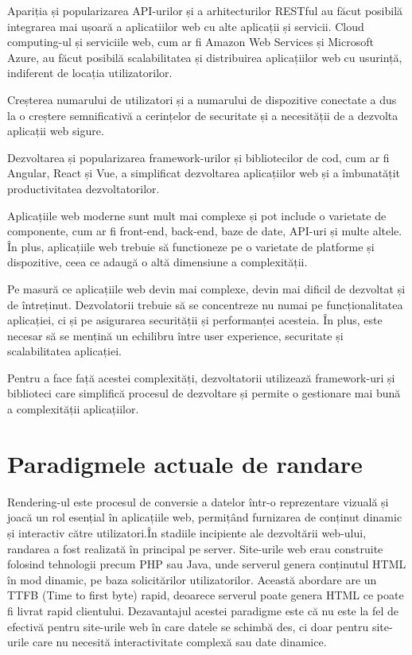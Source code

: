\documentclass[12pt, a4paper]{report}
\begin{document}
Apariția și popularizarea API-urilor și a arhitecturilor RESTful au făcut posibilă integrarea mai ușoară a aplicatiilor web cu alte aplicații și servicii. Cloud computing-ul și serviciile web, cum ar fi Amazon Web Services și Microsoft Azure, au făcut posibilă scalabilitatea și distribuirea aplicațiilor web cu usurință, indiferent de locația utilizatorilor.

Creșterea numarului de utilizatori și a numarului de dispozitive conectate a dus la o creștere semnificativă a cerințelor de securitate și a necesității de a dezvolta aplicații web sigure.

Dezvoltarea și popularizarea framework-urilor și bibliotecilor de cod, cum ar fi Angular, React și Vue, a simplificat dezvoltarea aplicațiilor web și a îmbunatățit productivitatea dezvoltatorilor.

Aplicațiile web moderne sunt mult mai complexe și pot include o varietate de componente, cum ar fi front-end, back-end, baze de date, API-uri și multe altele. În plus, aplicațiile web trebuie să functioneze pe o varietate de platforme și dispozitive, ceea ce adaugă o altă dimensiune a complexității.

Pe masură ce aplicațiile web devin mai complexe, devin mai dificil de dezvoltat și de întreținut. Dezvolatorii trebuie să se concentreze nu numai pe funcționalitatea aplicației, ci și pe asigurarea securității și performanței acesteia. În plus, este necesar să se mențină un echilibru între user experience, securitate și scalabilitatea aplicației.

Pentru a face față acestei complexități, dezvoltatorii utilizează framework-uri și biblioteci care simplifică procesul de dezvoltare și permite o gestionare mai bună a complexității aplicațiilor.


\chapter{Paradigmele actuale de randare}
Rendering-ul este procesul de conversie a datelor într-o reprezentare vizuală și joacă un rol esențial în aplicațiile web, permițând furnizarea de conținut dinamic și interactiv către utilizatori.În stadiile incipiente ale dezvoltării web-ului, randarea a fost realizată în principal pe server. Site-urile web erau construite folosind tehnologii precum PHP sau Java, unde serverul genera conținutul HTML în mod dinamic, pe baza solicitărilor utilizatorilor. Această abordare are un TTFB (Time to first byte) rapid, deoarece serverul poate genera HTML ce poate fi livrat rapid clientului. Dezavantajul acestei paradigme este c\u a nu este la fel de efectivă pentru site-urile web \^ in care datele se schimb\u a des, ci doar pentru site-urile care nu necesit\u a interactivitate complexă sau date dinamice. \cite{benefitsserverrendering}
\end{document}
